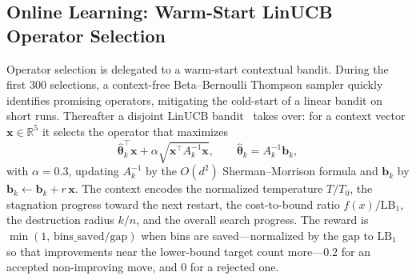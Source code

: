 \documentclass[conference]{IEEEtran}
\begin{document}
\subsection{Online Learning: Warm-Start LinUCB Operator Selection}
Operator selection is delegated to a warm-start contextual bandit. During the
first $300$ selections, a context-free Beta--Bernoulli Thompson sampler quickly
identifies promising operators, mitigating the cold-start of a linear bandit on
short runs. Thereafter a disjoint LinUCB bandit~\cite{bChu} takes over: for a
context vector $\mathbf{x}\in\mathbb{R}^5$ it selects the operator that maximizes
\begin{equation}
	\hat{\boldsymbol{\theta}}_k^\top \mathbf{x}
	+ \alpha\sqrt{\mathbf{x}^\top A_k^{-1}\mathbf{x}},
	\qquad \hat{\boldsymbol{\theta}}_k=A_k^{-1}\mathbf{b}_k,\label{eq:ucb}
\end{equation}
with $\alpha=0.3$, updating $A_k^{-1}$ by the $O(d^2)$ Sherman--Morrison formula
and $\mathbf{b}_k$ by $\mathbf{b}_k\leftarrow\mathbf{b}_k+r\,\mathbf{x}$. The
context encodes the normalized temperature $T/T_0$, the stagnation progress toward
the next restart, the cost-to-bound ratio $f(x)/\mathrm{LB}_1$, the destruction
radius $k/n$, and the overall search progress. The reward is
$\min(1,\,\text{bins\_saved}/\text{gap})$ when bins are saved---normalized by the
gap to $\mathrm{LB}_1$ so that improvements near the lower-bound target count more---$0.2$ for
an accepted non-improving move, and $0$ for a rejected one.
\end{document}
